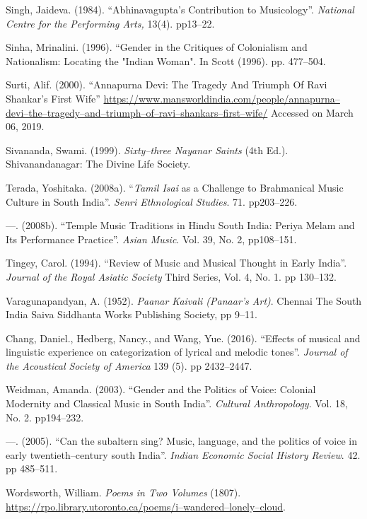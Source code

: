 \begin{thebibliography}{99}
  Singh, Jaideva. (1984). “Abhinavagupta's Contribution to Musicology”. \textit{National Centre for the Performing Arts, }13(4). pp13–22.

  Sinha, Mrinalini. (1996). “Gender in the Critiques of Colonialism and Nationalism: Locating the "Indian Woman". In Scott (1996). pp. 477–504.

  Surti, Alif. (2000). “Annapurna Devi: The Tragedy And Triumph Of Ravi Shankar’s First Wife” \url{https://www.mansworldindia.com/people/annapurna–devi–the–tragedy–and–triumph–of–ravi–shankars–first–wife/} Accessed on March 06, 2019.

  Sivananda, Swami. (1999). \textit{Sixty–three Nayanar Saints} (4th Ed.). Shivanandanagar: The Divine Life Society.

  Terada, Yoshitaka. (2008a). “\textit{Tamil Isai} as a Challenge to Brahmanical Music Culture in South India”. \textit{Senri Ethnological Studies}. 71. pp203–226.

  —. (2008b). “Temple Music Traditions in Hindu South India: Periya Melam and Its Performance Practice”. \textit{Asian Music}. Vol. 39, No. 2, pp108–151.

  Tingey, Carol. (1994). “Review of Music and Musical Thought in Early India”. \textit{Journal of the Royal Asiatic Society} Third Series, Vol. 4, No. 1. pp 130–132.

  Varagunapandyan, A. (1952). \textit{Paanar Kaivali (Panaar's Art)}. Chennai The South India Saiva Siddhanta Works Publishing Society, pp 9–11.

  Chang, Daniel., Hedberg, Nancy., and Wang, Yue. (2016). “Effects of musical and linguistic experience on categorization of lyrical and melodic tones”. \textit{Journal of the Acoustical Society of America} 139 (5). pp 2432–2447.

  Weidman, Amanda. (2003). “Gender and the Politics of Voice: Colonial Modernity and Classical Music in South India”. \textit{Cultural Anthropology}. Vol. 18, No. 2. pp194–232.

  —. (2005). “Can the subaltern sing? Music, language, and the politics of voice in early twentieth–century south India”. \textit{Indian Economic Social History Review}. 42. pp 485–511.

  Wordsworth, William. \textit{Poems in Two Volumes} (1807). \url{https://rpo.library.utoronto.ca/poems/i–wandered–lonely–cloud}.
 
 \end{thebibliography}


